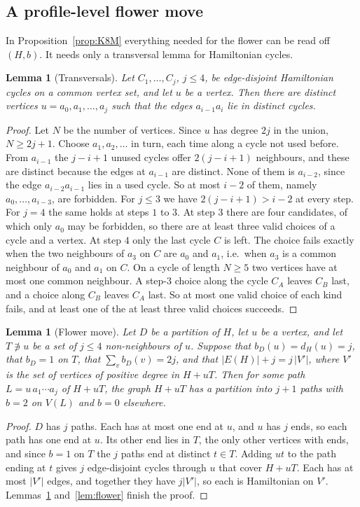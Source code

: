 \documentclass[11pt]{amsart}
\newtheorem{lemma}[theorem]{Lemma}
\theoremstyle{definition}
\begin{document}
\subsection*{A profile-level flower move}
In Proposition~\ref{prop:K8M} everything needed for the flower can be read off $(H,b)$. It needs
only a transversal lemma for Hamiltonian cycles.

\begin{lemma}[Transversals]\label{lem:transversal}
Let $C_1,\dots,C_j$, $j\le4$, be edge-disjoint Hamiltonian cycles on a common vertex set, and let
$u$ be a vertex. Then there are distinct vertices $u=a_0,a_1,\dots,a_j$ such that the edges
$a_{i-1}a_i$ lie in distinct cycles.
\end{lemma}
\begin{proof}
Let $N$ be the number of vertices. Since $u$ has degree $2j$ in the union, $N\ge2j+1$. Choose
$a_1,a_2,\dots$ in turn, each time along a cycle not used before. From $a_{i-1}$ the
$j-i+1$ unused cycles offer $2(j-i+1)$ neighbours, and these are distinct because the edges at
$a_{i-1}$ are distinct. None of them is $a_{i-2}$, since the edge $a_{i-2}a_{i-1}$ lies in a used
cycle. So at most $i-2$ of them, namely $a_0,\dots,a_{i-3}$, are forbidden. For $j\le3$ we have
$2(j-i+1)>i-2$ at every step. For $j=4$ the same holds at steps $1$ to $3$. At step $3$ there
are four candidates, of which only $a_0$ may be forbidden, so there are at least three valid
choices of a cycle and a vertex. At step $4$ only the last cycle $C$ is left. The choice fails
exactly when the two neighbours of $a_3$ on $C$ are $a_0$ and $a_1$, i.e.\ when $a_3$ is a common
neighbour of $a_0$ and $a_1$ on $C$. On a cycle of length $N\ge5$ two vertices have at most one
common neighbour. A step-$3$ choice along the cycle $C_A$ leaves $C_B$ last, and a choice along
$C_B$ leaves $C_A$ last. So at most one valid choice of each kind fails, and at least one of the
at least three valid choices succeeds.
\end{proof}

\begin{lemma}[Flower move]\label{lem:flowermove}
Let $D$ be a partition of $H$, let $u$ be a vertex, and let $T\not\ni u$ be a set of $j\le4$
non-neighbours of $u$. Suppose that $b_D(u)=d_H(u)=j$, that $b_D=1$ on $T$, that
$\sum_vb_D(v)=2j$, and that $|E(H)|+j=j\,|V'|$, where $V'$ is the set of vertices of positive
degree in $H+uT$. Then for some path $L=u\,a_1\cdots a_j$ of $H+uT$, the graph $H+uT$ has a
partition into $j+1$ paths with $b=2$ on $V(L)$ and $b=0$ elsewhere.
\end{lemma}
\begin{proof}
$D$ has $j$ paths. Each has at most one end at $u$, and $u$ has $j$ ends, so each path has one end
at $u$. Its other end lies in $T$, the only other vertices with ends, and since $b=1$ on $T$ the
$j$ paths end at distinct $t\in T$. Adding $ut$ to the path ending at $t$ gives $j$
edge-disjoint cycles through $u$ that cover $H+uT$. Each has at most $|V'|$ edges, and together
they have $j|V'|$, so each is Hamiltonian on $V'$. Lemmas~\ref{lem:transversal}
and~\ref{lem:flower} finish the proof.
\end{proof}
\end{document}
